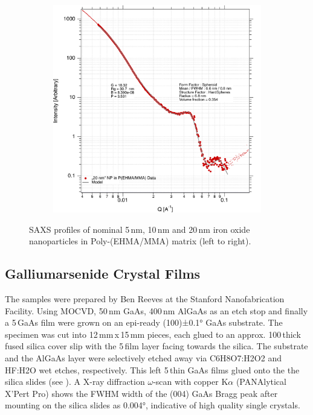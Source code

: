 \begin{figure}[tp]
\begin{subfigure}[b]{0.3\textwidth}
	\end{subfigure}
	\begin{subfigure}[b]{0.3\textwidth}
		\includegraphics[width=\linewidth]{images/pmma20.pdf}
	\end{subfigure}
	
	\caption[SAXS profile of iron oxide nanoparticles in  Poly-(EHMA/MMA) matrix]{SAXS profiles of nominal 5\,nm, 10\,nm and 20\,nm iron oxide nanoparticles in Poly-(EHMA/MMA) matrix (left to right).}
	\label{fig:saxspmma}
\end{figure}
\subsection{Galliumarsenide Crystal Films}
The samples were prepared by Ben Reeves at the Stanford Nanofabrication Facility.
Using MOCVD, 50\,nm GaAs, 400\,nm AlGaAs as an etch stop and finally a 5\,\micrometer GaAs film were grown on an epi-ready (100)±0.1° GaAs substrate. The specimen was cut into 12\,mm\,x\,15\,mm pieces, each glued to an approx. 100\,\micrometer thick fused silica cover slip with the 5\,\micrometer film layer facing towards the silica. The substrate and the AlGaAs layer were selectively etched away via C6H8O7:H2O2 and HF:H2O wet etches, respectively. This left 5\,\micrometer thin GaAs films glued onto the the silica slides (see ). 
A X-ray diffraction $\omega$-scan with copper K$\alpha$ (PANAlytical X’Pert Pro) shows the FWHM width of the (004) GaAs Bragg peak after mounting on the silica slides as 0.004°, indicative of high quality single crystals. 




